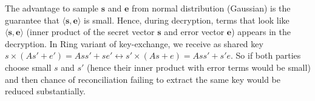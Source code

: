 The advantage to sample $\textbf{s}$ and $\textbf{e}$ from normal distribution (Gaussian) is the guarantee that $\langle \textbf{s}, \textbf{e} \rangle$ is small. Hence, during decryption, terms that look like $\langle \textbf{s}, \textbf{e} \rangle$ (inner product of the secret vector $\textbf{s}$ and error vector $\textbf{e}$) appears in the decryption. In Ring variant of key-exchange, we receive as shared key ${s} \times ({A} {s}'+{e}')={A} {s}{s}'+{s}{e}' \leftrightarrow {s}' \times ({A} {s}+{e})={A} {s} {s}'+{s}' {e}$. So if both parties choose small $s$ and $s'$ (hence their inner product with error terms would be small) and then chance of reconciliation failing to extract the same key would be reduced substantially. 






